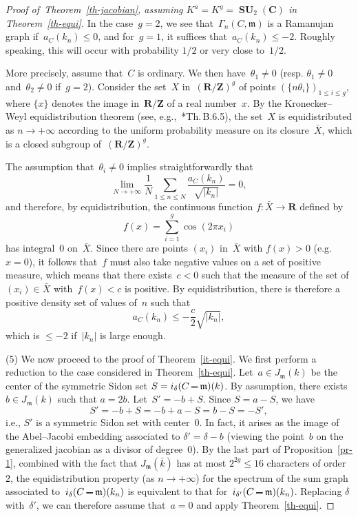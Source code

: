 \documentclass[12pt]{amsart}
\renewcommand{\leq}{\leqslant}
\numberwithin{equation}{section}
\def\setminus{\mathchoice
    {\mathbin{\vrule height .62ex width 1.61ex depth -.38ex}}%
    {\mathbin{\vrule height .62ex width 1.61ex depth -.38ex}}%
    {\mathbin{\vrule height .50ex width 0.85ex depth -.28ex}}%
    {\mathbin{\vrule height .20ex width 0.570ex depth -.24ex}}%
}
\newcommand{\Cc}{\mathbf{C}}
\newcommand{\Zz}{\mathbf{Z}}
\newcommand{\Rr}{\mathbf{R}}
\newcommand{\mfm}{\mathfrak{m}}
\DeclareMathOperator{\SU}{\mathbf{SU}}
\theoremstyle{plain}
\theoremstyle{remark}
\theoremstyle{definition}
\renewcommand{\leq}{\leqslant}
\begin{document}
\begin{proof}[Proof of~Theorem~\ref{th-jacobian}, assuming
  $K^a=K^g=\SU_2(\Cc)$ in Theorem~\ref{th-equi}]
  In the case~$g=2$, we see that~$\Gamma_n(C,\mfm)$ is a Ramanujan graph
  if~$a_C(k_n)\leq 0$, and for~$g=1$, it suffices
  that~$a_C(k_n)\leq -2$. Roughly speaking, this will occur with
  probability $1/2$ or very close to~$1/2$.

  More precisely, assume that~$C$ is ordinary. We then
  have~$\theta_1\not=0$ (resp. $\theta_1\not=0$ and~$\theta_2\not=0$
  if~$g=2$). Consider the set~$X$ in~$(\Rr/\Zz)^g$ of points
  $(\{n\theta_i\})_{1\leq i\leq g}$, where $\{x\}$ denotes the image
  in~$\Rr/\Zz$ of a real number~$x$.  By the Kronecker--Weyl
  equidistribution theorem (see, e.g.,~\cite{pnt}*{Th.\,B.6.5}), the
  set~$X$ is equidistributed as $n\to +\infty$ according to the
  uniform probability measure on its closure~$\bar{X}$, which is a
  closed subgroup of~$(\Rr/\Zz)^g$.
  
  The assumption that~$\theta_i\not=0$ implies straightforwardly that
  \[
    \lim_{N\to +\infty}
    \frac{1}{N}\sum_{1\leq n\leq N}\frac{a_C(k_n)}{\sqrt{|k_n|}}=0,
  \]
  and therefore, by equidistribution, the continuous function
  $f\colon \bar{X}\to \Rr$ defined by
  \[
    f(x)=\sum_{i=1}^g\cos(2\pi x_i)
  \]
  has integral~$0$ on~$\bar{X}$.  Since there are points $(x_i)$
  in~$\bar{X}$ with $f(x)>0$ (e.g. $x=0$), it follows that~$f$ must
  also take negative values on a set of positive measure, which means
  that there exists~$c<0$ such that the measure of the set of
  $(x_i)\in\bar{X}$ with~$f(x)<c$ is positive. By equidistribution,
  there is therefore a positive density set of values of~$n$ such that
  \[
    a_C(k_n)\leq -\frac{c}{2}\sqrt{|k_n|},
  \]
  which is $\leq -2$ if~$|k_n|$ is large enough.

  (5) We now proceed to the proof of Theorem~\ref{it-equi}. We first
  perform a reduction to the case considered in
  Theorem~\ref{th-equi}. Let~$a\in J_{\mfm}(k)$ be the center of the
  symmetric Sidon set $S=i_{\delta}(C\setminus\mfm)(k)$. By assumption,
  there exists $b\in J_{\mfm}(k)$ such that $a=2b$. Let~$S'=-b+S$. Since
  $S=a-S$, we have
  \[
    S'=-b+S=-b+a-S=b-S=-S',
  \]
  i.e., $S'$ is a symmetric Sidon set with center~$0$. In fact, it
  arises as the image of the Abel--Jacobi embedding associated to
  $\delta'=\delta-b$ (viewing the point~$b$ on the generalized jacobian
  as a divisor of degree~$0$). By the last part of
  Proposition~\ref{pr-1}, combined with the fact that
  $J_{\mfm}(\bar{k})$ has at most $2^{2g}\leq 16$ characters of
  order~$2$, the equidistribution property (as $n\to +\infty$) for the
  spectrum of the sum graph associated
  to~$i_{\delta}(C\setminus \mfm)(k_n)$ is equivalent to that
  for~$i_{\delta'}(C\setminus \mfm)(k_n)$. Replacing $\delta$
  with~$\delta'$, we can therefore assume that~$a=0$ and apply
  Theorem~\ref{th-equi}.


\end{proof}
\end{document}
